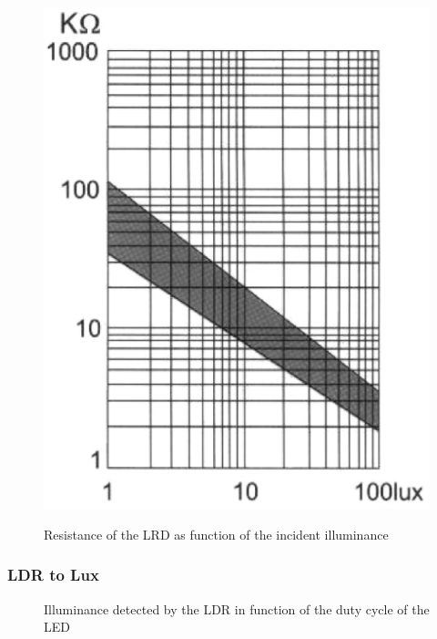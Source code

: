 \begin{figure}[h]
    \centering
    \includegraphics[width=.4\textwidth]{img/LDR_datasheet}
    \caption{}
    \label{fig:LDR_datasheet}
\end{figure}

\begin{figure}[h]
    \centering
    \resizebox{\textwidth}{!}{}
    \caption{Resistance of the LRD as function of the incident illuminance}
    \label{fig:LDR_model}
\end{figure}

\subsubsection{LDR to Lux}
\label{sub:LDRtoLux}

\begin{figure}[h]
    \centering
    \resizebox{\textwidth}{!}{}
    \caption{Illuminance detected by the LDR in function of the duty cycle of the LED}
    \label{fig:pwm_to_lux}
\end{figure}

